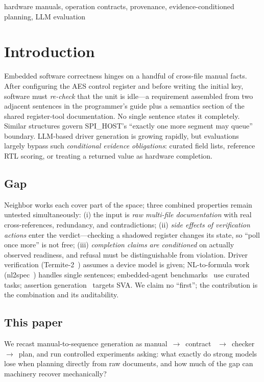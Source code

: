 \documentclass[conference]{IEEEtran}
\begin{document}
\begin{IEEEkeywords}
hardware manuals, operation contracts, provenance,
evidence-conditioned planning, LLM evaluation
\end{IEEEkeywords}

\section{Introduction}
Embedded software correctness hinges on a handful of cross-file manual
facts. After configuring the AES control register and before writing the
initial key, software must \emph{re-check} that the unit is idle---a
requirement assembled from two adjacent sentences in the programmer's
guide plus a semantics section of the shared register-tool documentation.
No single sentence states it completely. Similar structures govern
SPI\_HOST's ``exactly one more segment may queue'' boundary. LLM-based
driver generation is growing rapidly, but evaluations largely bypass such
\emph{conditional evidence obligations}: curated field lists, reference
RTL scoring, or treating a returned value as hardware completion.

\subsection{Gap}
Neighbor works each cover part of the space; three combined properties
remain untested simultaneously: (i) the input is \emph{raw multi-file
documentation} with real cross-references, redundancy, and
contradictions; (ii) \emph{side effects of verification actions} enter
the verdict---checking a shadowed register changes its state, so
``poll once more'' is not free; (iii) \emph{completion claims are
conditioned} on actually observed readiness, and refusal must be
distinguishable from violation. Driver verification (Termite-2~\cite{termite2})
assumes a device model is given; NL-to-formula work (nl2spec~\cite{nl2spec})
handles single sentences; embedded-agent benchmarks~\cite{embedbench}
use curated tasks; assertion generation~\cite{assertllm2} targets SVA.
We claim no ``first''; the contribution is the combination and its
auditability.

\subsection{This paper}
We recast manual-to-sequence generation as manual~$\rightarrow$~contract~%
$\rightarrow$~checker~$\rightarrow$~plan, and run controlled experiments
asking: what exactly do strong models lose when planning directly from
raw documents, and how much of the gap can machinery recover
mechanically?
\end{document}
